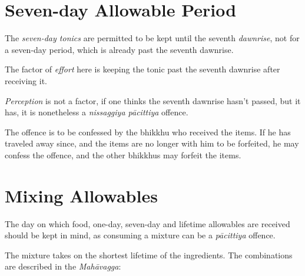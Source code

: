 \section*{Seven-day Allowable Period}

The \emph{seven-day tonics} are permitted to be kept until the seventh
\emph{dawnrise}, not for a seven-day period, which is already past the seventh
dawnrise.

The factor of \emph{effort} here is keeping the tonic past the seventh dawnrise
after receiving it.

\emph{Perception} is not a factor, if one thinks the seventh dawnrise hasn't
passed, but it has, it is nonetheless a \emph{nissaggiya pācittiya} offence.

The offence is to be confessed by the bhikkhu who received the items. If he has
traveled away since, and the items are no longer with him to be forfeited, he
may confess the offence, and the other bhikkhus may forfeit the items.

\section*{Mixing Allowables}

The day on which food, one-day, seven-day and lifetime allowables are received
should be kept in mind, as consuming a mixture can be a \emph{pācittiya}
offence.

The mixture takes on the shortest lifetime of the ingredients. 
The combinations are described in the \emph{Mahāvagga}:

\ifhandbookedition
\clearpage
\mbox{}\vfill
\fi

